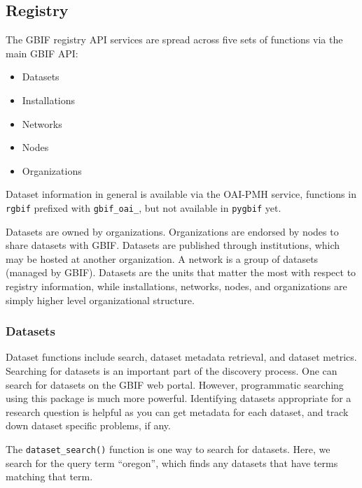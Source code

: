 \documentclass[author-year, review, 11pt]{components/elsarticle} %
\begin{document}
\subsection{Registry}\label{registry}

The GBIF registry API services are spread across five sets of functions
via the main GBIF API:

\begin{itemize}
\itemsep1pt\parskip0pt
\item
  Datasets
\item
  Installations
\item
  Networks
\item
  Nodes
\item
  Organizations
\end{itemize}

Dataset information in general is available via the OAI-PMH service,
functions in \texttt{rgbif} prefixed with \texttt{gbif\_oai\_}, but not
available in \texttt{pygbif} yet.

Datasets are owned by organizations. Organizations are endorsed by nodes
to share datasets with GBIF. Datasets are published through
institutions, which may be hosted at another organization. A network is
a group of datasets (managed by GBIF). Datasets are the units that
matter the most with respect to registry information, while
installations, networks, nodes, and organizations are simply higher
level organizational structure.

\subsubsection{Datasets}\label{datasets}

Dataset functions include search, dataset metadata retrieval, and
dataset metrics. Searching for datasets is an important part of the
discovery process. One can search for datasets on the GBIF web portal.
However, programmatic searching using this package is much more
powerful. Identifying datasets appropriate for a research question is
helpful as you can get metadata for each dataset, and track down dataset
specific problems, if any.

The \texttt{dataset\_search()} function is one way to search for
datasets. Here, we search for the query term ``oregon'', which finds any
datasets that have terms matching that term.
\end{document}
